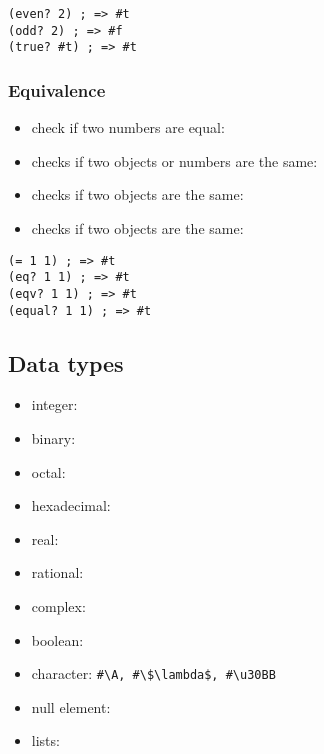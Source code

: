 \documentclass[a4paper,landscape,10pt]{article}
\begin{document}
\begin{multicols*}{2}
  \begin{lstlisting}[language=Racket]
(even? 2) ; => #t
(odd? 2) ; => #f
(true? #t) ; => #t
\end{lstlisting}

  \subsubsection{Equivalence}

  \begin{itemize}
    \item check if two numbers are equal: \iracket{=}
    \item checks if two objects or numbers are the same: 
    \item checks if two objects are the same: 
    \item checks if two objects are the same: 
  \end{itemize}

  \begin{lstlisting}[language=Racket]
(= 1 1) ; => #t
(eq? 1 1) ; => #t
(eqv? 1 1) ; => #t
(equal? 1 1) ; => #t
\end{lstlisting}

  \subsection{Data types}

  \begin{itemize}
    \item integer: 
    \item binary: 
    \item octal: 
    \item hexadecimal: 
    \item real: 
    \item rational: 
    \item complex: 
    \item boolean: 
    \item character: \lstinline[language=Racket]!#\A, #\$\lambda$, #\u30BB! %
    \item null element: 
    \item lists: 
  \end{itemize}


\end{multicols*}
\end{document}

